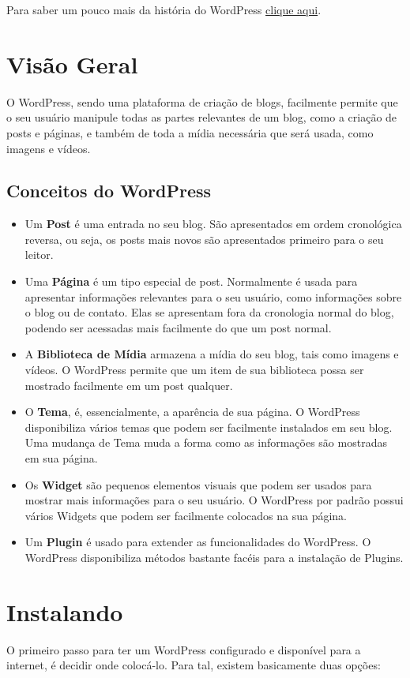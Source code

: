 \documentclass[12pt,onecolumn]{article}
\begin{document}
	Para saber um pouco mais da história do WordPress  \href{http://wordpress.org/about/}{clique aqui}.
          
\section{Visão Geral}
	O WordPress, sendo uma plataforma de criação de blogs, facilmente permite que o seu usuário manipule 
	todas as partes relevantes de um blog, como a criação de posts e páginas, e também de toda a mídia 
	necessária que será usada, como imagens e vídeos.

	\subsection{Conceitos do WordPress}
	\begin{itemize}
		\item Um \textbf{Post} é uma entrada no seu blog. São apresentados em ordem cronológica 
        reversa, ou seja, os posts mais novos são apresentados primeiro para o seu leitor.  
		\item Uma \textbf{Página} é um tipo especial de post. Normalmente é usada para apresentar 
		informações relevantes para o seu usuário, como informações sobre o blog ou de contato. 
		Elas se apresentam fora da cronologia normal do blog, podendo ser acessadas mais facilmente 
		do que um post normal.
		\item A \textbf{Biblioteca de Mídia} armazena a mídia do seu blog, tais como imagens e vídeos.
		O WordPress permite que um item de sua biblioteca possa ser mostrado facilmente em um post
		qualquer.
		\item O \textbf{Tema}, é, essencialmente, a aparência de sua página. O WordPress disponibiliza 
		vários temas que podem ser facilmente instalados em seu blog. Uma mudança de Tema muda a
		forma como as informações são mostradas em sua página.
		\item Os \textbf{Widget} são pequenos elementos visuais que podem ser usados para mostrar 
		mais informações para o seu usuário. O WordPress por padrão possui vários Widgets que podem 
		ser facilmente colocados na sua página.
		\item Um \textbf{Plugin} é usado para extender as funcionalidades do WordPress. O WordPress
		disponibiliza métodos bastante facéis para a instalação de Plugins.
	\end{itemize}

\section{Instalando}
	O primeiro passo para ter um WordPress configurado e disponível para a internet, é decidir onde colocá-lo.
	Para tal, existem basicamente duas opções:
\end{document}
